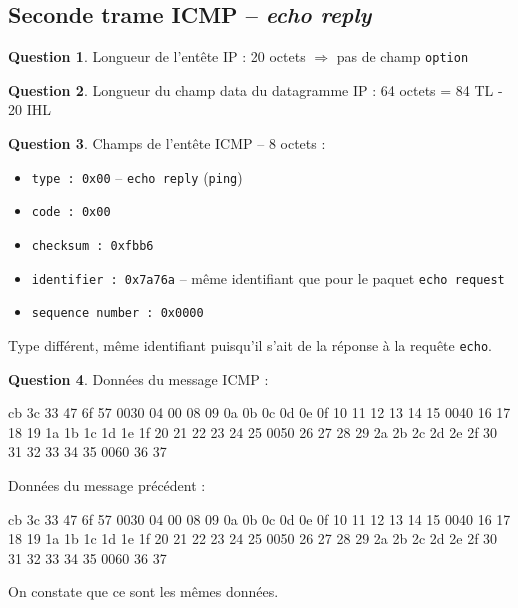 \documentclass[11pt,english,french]{scrreprt}
\theoremstyle{remark}
\theoremstyle{definition}
\newtheorem{ques*}{Question}[subsection]
\begin{document}
\subsection{Seconde trame ICMP -- \emph{echo reply}} %

\begin{ques*}
	Longueur de l'entête IP : 20 octets $\Rightarrow$ pas de champ \lstinline!option!
\end{ques*}

\begin{ques*}
	Longueur du champ data du datagramme IP : 64 octets = 84 TL - 20 IHL
\end{ques*}

\begin{ques*}
	Champs de l'entête ICMP -- 8 octets :\begin{itemize}
		\item \lstinline!type : 0x00! -- \lstinline!echo reply! (\lstinline!ping!)
		\item \lstinline!code : 0x00!
		\item \lstinline!checksum : 0xfbb6!
		\item \lstinline!identifier : 0x7a76a! -- même identifiant que pour le paquet \lstinline!echo request!
		\item \lstinline!sequence number : 0x0000!
	\end{itemize}
	
	Type différent, même identifiant puisqu'il s'ait de la réponse à la requête \lstinline!echo!.
\end{ques*}

\begin{ques*}
	Données du message ICMP :
\begin{verbatimtab}[4]
									 cb 3c 33 47 6f 57
0030  04 00 08 09 0a 0b 0c 0d  0e 0f 10 11 12 13 14 15
0040  16 17 18 19 1a 1b 1c 1d  1e 1f 20 21 22 23 24 25
0050  26 27 28 29 2a 2b 2c 2d  2e 2f 30 31 32 33 34 35
0060  36 37
\end{verbatimtab}

	Données du message précédent :
\begin{verbatimtab}[4]
									 cb 3c 33 47 6f 57
0030  04 00 08 09 0a 0b 0c 0d  0e 0f 10 11 12 13 14 15
0040  16 17 18 19 1a 1b 1c 1d  1e 1f 20 21 22 23 24 25
0050  26 27 28 29 2a 2b 2c 2d  2e 2f 30 31 32 33 34 35
0060  36 37
\end{verbatimtab}
	On constate que ce sont les mêmes données.
\end{ques*}

\setcounter{ques}{4}
\end{document}
